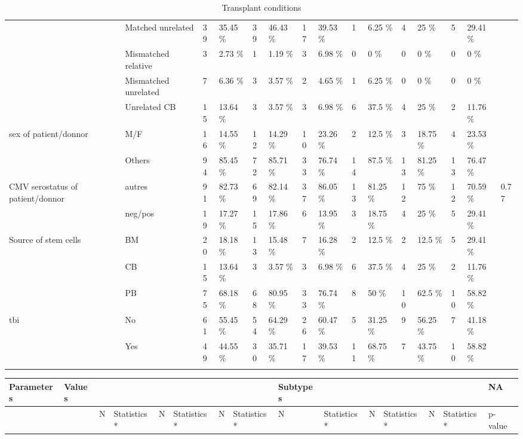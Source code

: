 \documentclass[a4paper,11pt] {article}
\begin{document}
\begin{landscape}
\begin{longtable}{lllllllllllllll}
   & Matched unrelated & 39 & 35.45 \% & 39 & 46.43 \% & 17 & 39.53 \% & 1 & 6.25 \% & 4 & 25 \% & 5 & 29.41 \% &  \\ 
   & Mismatched relative & 3 & 2.73 \% & 1 & 1.19 \% & 3 & 6.98 \% & 0 & 0 \% & 0 & 0 \% & 0 & 0 \% &  \\ 
   & Mismatched unrelated & 7 & 6.36 \% & 3 & 3.57 \% & 2 & 4.65 \% & 1 & 6.25 \% & 0 & 0 \% & 0 & 0 \% &  \\ 
   & Unrelated CB & 15 & 13.64 \% & 3 & 3.57 \% & 3 & 6.98 \% & 6 & 37.5 \% & 4 & 25 \% & 2 & 11.76 \% &  \\ 
  sex of patient/donnor & M/F & 16 & 14.55 \% & 12 & 14.29 \% & 10 & 23.26 \% & 2 & 12.5 \% & 3 & 18.75 \% & 4 & 23.53 \% &  \\ 
   & Others & 94 & 85.45 \% & 72 & 85.71 \% & 33 & 76.74 \% & 14 & 87.5 \% & 13 & 81.25 \% & 13 & 76.47 \% &  \\ 
  CMV serostatus of patient/donnor & autres & 91 & 82.73 \% & 69 & 82.14 \% & 37 & 86.05 \% & 13 & 81.25 \% & 12 & 75 \% & 12 & 70.59 \% & 0.77 \\ 
   & neg/pos & 19 & 17.27 \% & 15 & 17.86 \% & 6 & 13.95 \% & 3 & 18.75 \% & 4 & 25 \% & 5 & 29.41 \% &  \\ 
  Source of stem cells & BM & 20 & 18.18 \% & 13 & 15.48 \% & 7 & 16.28 \% & 2 & 12.5 \% & 2 & 12.5 \% & 5 & 29.41 \% &  \\ 
   & CB & 15 & 13.64 \% & 3 & 3.57 \% & 3 & 6.98 \% & 6 & 37.5 \% & 4 & 25 \% & 2 & 11.76 \% &  \\ 
   & PB & 75 & 68.18 \% & 68 & 80.95 \% & 33 & 76.74 \% & 8 & 50 \% & 10 & 62.5 \% & 10 & 58.82 \% &  \\ 
  tbi & No & 61 & 55.45 \% & 54 & 64.29 \% & 26 & 60.47 \% & 5 & 31.25 \% & 9 & 56.25 \% & 7 & 41.18 \% &  \\ 
   & Yes & 49 & 44.55 \% & 30 & 35.71 \% & 17 & 39.53 \% & 11 & 68.75 \% & 7 & 43.75 \% & 10 & 58.82 \% &  \\ 
   \hline
\hline
\caption{Transplant conditions} 
\label{tab:tra}
\end{longtable}
\begin{longtable}{lllllllllllllll}
  \hline
Parameters & Values &  &  &  &  &  &  & Subtypes &  &  &  &  &  & NA \\ 
  \hline
 &  & N & Statistics* & N & Statistics* & N & Statistics* & N & Statistics* & N & Statistics* & N & Statistics* & p-value \\ 

\end{longtable}
\end{landscape}
\end{document}
